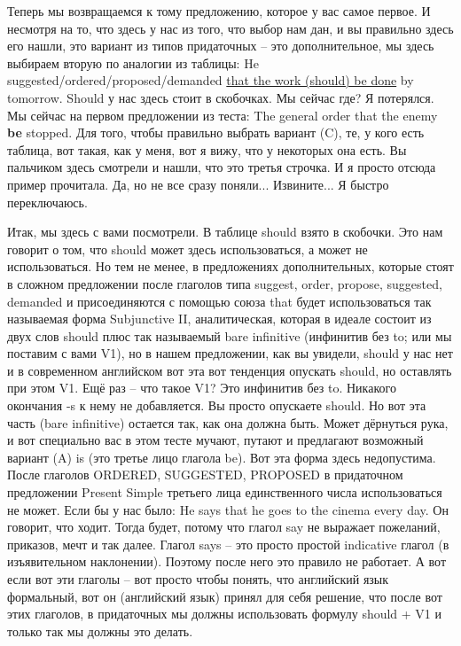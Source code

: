 \documentclass[main.tex]{subfiles}
\begin{document}
Теперь мы возвращаемся к тому предложению, которое у вас самое первое.
И несмотря на то, что здесь у нас из того, что выбор нам дан, и вы правильно здесь его нашли, это вариант из типов придаточных -- это дополнительное, мы здесь выбираем вторую по аналогии из таблицы: He suggested/ordered/proposed/demanded \uline{that the work (should) be done} by tomorrow.
Should у нас здесь стоит в скобочках.
Мы сейчас где?
Я потерялся.
Мы сейчас на первом предложении из теста: The general order that the enemy \textbf{be} stopped.
Для того, чтобы правильно выбрать вариант (C), те, у кого есть таблица, вот такая, как у меня, вот я вижу, что у некоторых она есть.
Вы пальчиком здесь смотрели и нашли, что это третья строчка.
И я просто отсюда пример прочитала.
Да, но не все сразу поняли...
Извините...
Я быстро переключаюсь.

Итак, мы здесь с вами посмотрели.
В таблице should взято в скобочки.
Это нам говорит о том, что should может здесь использоваться, а может не использоваться.
Но тем не менее, в предложениях дополнительных, которые стоят в сложном предложении после глаголов типа suggest, order, propose, suggested, demanded и присоединяются с помощью союза that будет использоваться так называемая форма Subjunctive II, аналитическая, которая в идеале состоит из двух слов should плюс так называемый bare infinitive (инфинитив без to; или мы поставим с вами V1), но в нашем предложении, как вы увидели, should у нас нет и в современном английском вот эта вот тенденция опускать should, но оставлять при этом V1.
Ещё раз -- что такое V1?
Это инфинитив без to.
Никакого окончания -s к нему не добавляется.
Вы просто опускаете should.
Но вот эта часть (bare infinitive) остается так, как она должна быть.
Может дёрнуться рука, и вот специально вас в этом тесте мучают, путают и предлагают возможный вариант (A) is (это третье лицо глагола be).
Вот эта форма здесь недопустима.
После глаголов ORDERED, SUGGESTED, PROPOSED в придаточном предложении Present Simple третьего лица единственного числа использоваться не может.
Если бы у нас было: He says that he goes to the cinema every day.
Он говорит, что ходит.
Тогда будет, потому что глагол say не выражает пожеланий, приказов, мечт и так далее.
Глагол says -- это просто простой indicative глагол (в изъявительном наклонении).
Поэтому после него это правило не работает.
А вот если вот эти глаголы -- вот просто чтобы понять, что английский язык формальный, вот он (английский язык) принял для себя решение, что после вот этих глаголов, в придаточных мы должны использовать формулу should + V1 и только так мы должны это делать.
\end{document}
